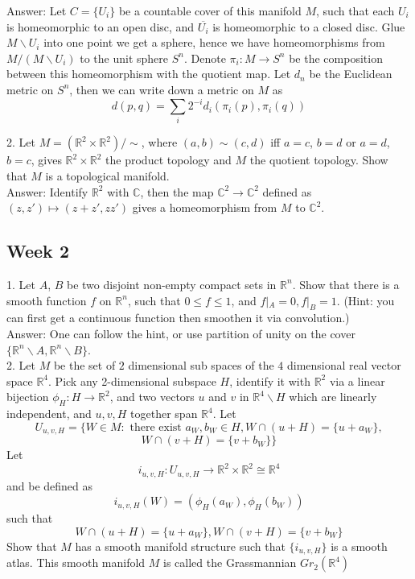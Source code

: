 \documentclass{article}
\theoremstyle{definition}
\begin{document}
Answer: Let $C=\{U_i\}$ be a countable cover of this manifold $M$, such that each $U_i$ is homeomorphic to an open disc, and $\overline{U_i}$ is homeomorphic to a closed disc. Glue $M\backslash U_i$ into one point we get a sphere, hence we have homeomorphisms from $M/(M\backslash U_i)$ to the unit sphere $S^n$. Denote $\pi_i: M\rightarrow S^n$ be the composition between this homeomorphism with the quotient map. Let $d_n$ be the Euclidean metric on $S^n$, then we can write down a metric on $M$ as 
\[d(p, q)=\sum_i 2^{-i}d_i(\pi_i(p), \pi_i(q))\]

2. Let $M=(\mathbb{R}^2\times\mathbb{R}^2)/\sim$, where $(a, b)\sim (c, d)$ iff $a=c$, $b=d$ or $a=d$, $b=c$, gives $\mathbb{R}^2\times\mathbb{R}^2$ the product topology and $M$ the quotient topology. Show that $M$ is a topological manifold.\\

Answer: Identify $\mathbb{R}^2$ with $\mathbb{C}$, then the map $\mathbb{C}^2\rightarrow \mathbb{C}^2$ defined as $(z, z')\mapsto (z+z', zz')$ gives a homeomorphism from $M$ to $\mathbb{C}^2$.

\subsection{Week 2}

1. Let $A$, $B$ be two disjoint non-empty compact sets in $\mathbb{R}^n$. Show that there is a smooth function $f$ on $\mathbb{R}^n$, such that $0\leq f\leq 1$, and $f|_A=0, f|_B=1$. (Hint: you can first get a continuous function then smoothen it via convolution.)\\

Answer: One can follow the hint, or use partition of unity on the cover $\{\mathbb{R}^n\backslash A, \mathbb{R}^n\backslash B\}$.\\

2. Let $M$ be the set of $2$ dimensional sub spaces of the $4$ dimensional real vector space $\mathbb{R}^4$. Pick any 2-dimensional subspace $H$, identify it with $\mathbb{R}^2$ via a linear bijection $\phi_H: H\rightarrow \mathbb{R}^2$, and two vectors $u$ and $v$ in $\mathbb{R}^4\backslash H$ which are linearly independent, and $u, v, H$ together span $\mathbb{R}^4$. Let 
\[U_{u, v, H}=\{W\in M: \text{ there exist }a_W, b_W\in H, W\cap (u+H)=\{u+a_W\},\]
\[W\cap (v+H)=\{v+b_W\}\}\]
Let 
\[i_{u, v, H}: U_{u, v, H}\rightarrow \mathbb{R}^2\times \mathbb{R}^2\cong\mathbb{R}^4\]
and be defined as 
\[i_{u, v, H}(W)=(\phi_H(a_W), \phi_H(b_W))\]
such that
\[W\cap (u+H)=\{u+a_W\}, W\cap (v+H)=\{v+b_W\}\]
Show that $M$ has a smooth manifold structure such that $\{i_{u, v, H}\}$ is a smooth atlas. This smooth manifold $M$ is called the Grassmannian $Gr_2(\mathbb{R}^4)$\\
\end{document}
